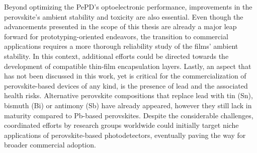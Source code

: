 Beyond optimizing the PePD's optoelectronic performance, improvements in the perovskite's ambient stability and toxicity are also essential. Even though the advancements presented in the scope of this thesis are already a major leap forward for prototyping-oriented endeavors, the transition to commercial applications requires a more thorough reliability study of the films' ambient stability. In this context, additional efforts could be directed towards the development of compatible thin-film encapsulation layers. Lastly, an aspect that has not been discussed in this work, yet is critical for the commercialization of perovskite-based devices of any kind, is the presence of lead and the associated health risks. Alternative perovskite compositions that replace lead with tin (Sn), bismuth (Bi) or antimony (Sb) have already appeared, however they still lack in maturity compared to Pb-based perovskites. Despite the considerable challenges, coordinated efforts by research groups worldwide could initially target niche applications of perovskite-based photodetectors, eventually paving the way for broader commercial adoption.


\cleardoublepage

